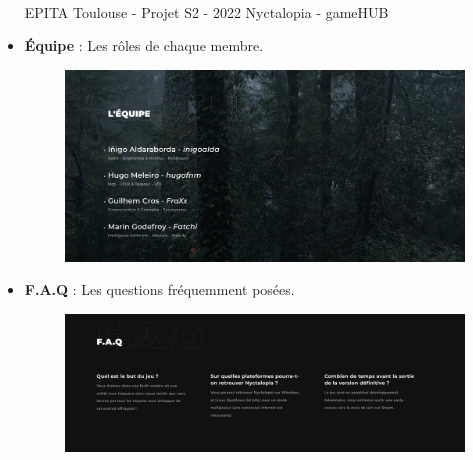 \begin{itemize}
\vfill
\noindent\makebox[\linewidth]{\rule{.8\paperwidth}{.6pt}}\\[0.2cm]
EPITA Toulouse - Projet S2 - 2022 \hfill Nyctalopia - gameHUB
\noindent\makebox[\linewidth]{\rule{.8\paperwidth}{.6pt}}
\newpage

    \item \textbf{Équipe} : Les rôles de chaque membre.
    \newline

\begin{figure}[H]
\centering
\begin{minipage}{.5\textwidth}
  \centering
  \centerline{\includegraphics[width=1\linewidth]{img/team.PNG}}
  \label{fig:team}
\end{minipage}%
\end{figure}
    

    \item \textbf{F.A.Q} : Les questions fréquemment posées.
    \newline

\begin{figure}[H]
\centering
\begin{minipage}{.5\textwidth}
  \centering
  \centerline{\includegraphics[width=1\linewidth]{img/faq.PNG}}
  \label{fig:faq}
\end{minipage}%
\end{figure}


\end{itemize}
